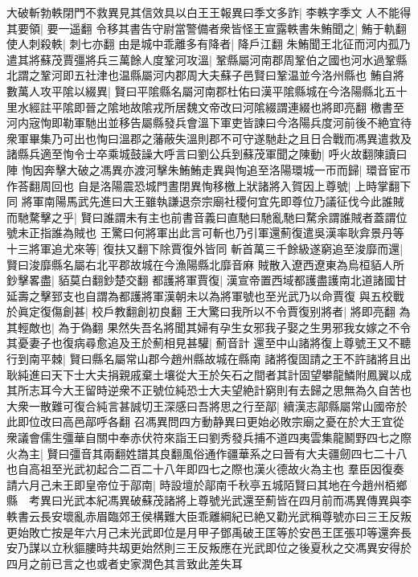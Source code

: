 大破斬勃軼閉門不救異見其信效具以白王王報異曰季文多詐|{
	李軼字季文}
人不能得其要領|{
	要一遥翻}
令移其書告守尉當警備者衆皆怪王宣露軼書朱鮪聞之|{
	鮪于軌翻}
使人刺殺軼|{
	刺七亦翻}
由是城中乖離多有降者|{
	降戶江翻}
朱鮪聞王北征而河内孤乃遣其將蘇茂賈彊將兵三萬餘人度鞏河攻溫|{
	鞏縣屬河南郡周鞏伯之國也河水過鞏縣北謂之鞏河即五社津也温縣屬河内郡周大夫蘇子邑賢曰鞏温並今洛州縣也}
鮪自將數萬人攻平隂以綴異|{
	賢曰平隂縣名屬河南郡杜佑曰漢平隂縣城在今洛陽縣北五十里水經註平隂即晉之隂地故隂戎所居魏文帝改曰河隂綴謂連綴也將即亮翻}
檄書至河内宼恂即勒軍馳出並移告屬縣發兵會溫下軍吏皆諫曰今洛陽兵度河前後不絶宜待衆軍畢集乃可出也恂曰溫郡之藩蔽失溫則郡不可守遂馳赴之且日合戰而馮異遣救及諸縣兵適至恂令士卒乘城鼓譟大呼言曰劉公兵到蘇茂軍聞之陳動|{
	呼火故翻陳讀曰陣}
恂因奔擊大破之馮異亦渡河擊朱鮪鮪走異與恂追至洛陽環城一帀而歸|{
	環音宦帀作荅翻周回也}
自是洛陽震恐城門晝閉異恂移檄上狀諸將入賀因上尊號|{
	上時掌翻下同}
將軍南陽馬武先進曰大王雖執謙退奈宗廟社稷何宜先即尊位乃議征伐今此誰賊而馳騖擊之乎|{
	賢曰誰謂未有主也前書音義曰直馳曰馳亂馳曰騖余謂誰賊者蓋謂位號未正指誰為賊也}
王驚曰何將軍出此言可斬也乃引軍還薊復遣吳漢率耿弇景丹等十三將軍追尤來等|{
	復扶又翻下除賈復外皆同}
斬首萬三千餘級遂窮追至浚靡而還|{
	賢曰浚靡縣名屬右北平郡故城在今漁陽縣北靡音麻}
賊散入遼西遼東為烏桓貊人所鈔擊畧盡|{
	貊莫白翻鈔楚交翻}
都護將軍賈復|{
	漢宣帝置西域都護盡護南北道諸國甘延壽之擊郅支也自謂為都護將軍漢朝未以為將軍號也至光武乃以命賈復}
與五校戰於眞定復傷創甚|{
	校戶教翻創初良翻}
王大驚曰我所以不令賈復别將者|{
	將即亮翻}
為其輕敵也|{
	為于偽翻}
果然失吾名將聞其婦有孕生女邪我子娶之生男邪我女嫁之不令其憂妻子也復病尋愈追及王於薊相見甚驩|{
	薊音計}
還至中山諸將復上尊號王又不聽行到南平棘|{
	賢曰縣名屬常山郡今趙州縣故城在縣南}
諸將復固請之王不許諸將且出耿純進曰天下士大夫捐親戚棄土壤從大王於矢石之間者其計固望攀龍鱗附鳳翼以成其所志耳今大王留時逆衆不正號位純恐士大夫望絶計窮則有去歸之思無為久自苦也大衆一散難可復合純言甚誠切王深感曰吾將思之行至鄗|{
	續漢志鄗縣屬常山國帝於此即位改曰高邑鄗呼各翻}
召馮異問四方動静異曰更始必敗宗廟之憂在於大王宜從衆議會儒生彊華自關中奉赤伏符來詣王曰劉秀發兵捕不道四夷雲集龍鬭野四七之際火為主|{
	賢曰彊音其兩翻姓譜其良翻風俗通作疆華系之曰晉有大夫疆劒四七二十八也自高祖至光武初起合二百二十八年即四七之際也漢火德故火為主也}
羣臣因復奏請六月己未王即皇帝位于鄗南|{
	時設壇於鄗南千秋亭五城陌賢曰其地在今趙州栢鄉縣　考異曰光武本紀馮異破蘇茂諸將上尊號光武還至薊皆在四月前而馮異傳異與李軼書云長安壞亂赤眉臨郊王侯構難大臣乖離綱紀已絶又勸光武稱尊號亦曰三王反叛更始敗亡按是年六月己未光武即位是月甲子鄧禹破王匡等於安邑王匡張卭等還奔長安乃謀以立秋貙膢時共刼更始然則三王反叛應在光武即位之後夏秋之交馮異安得於四月之前已言之也或者史家潤色其言致此差失耳}
